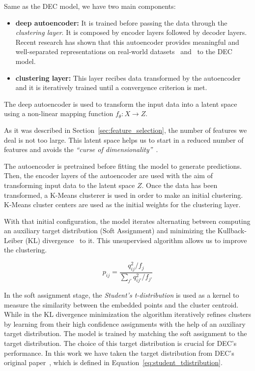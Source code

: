 \documentclass[11pt,a4paper,english,twocolumn]{article}
\begin{document}
Same as the DEC model, we have two main components:

\begin{itemize}
  \item \textbf{deep autoencoder:} It is trained before passing the data through the
        \emph{clustering layer}. It is composed by encoder layers followed by decoder
        layers. Recent research has shown that this autoencoder provides meaningful and
        well-separated representations on real-world datasets~\cite{vincent2010stacked}
        and~\cite{hinton2006reducing} to the DEC model.
  \item \textbf{clustering layer:} This layer recibes data transformed by the autoencoder
        and it is iteratively trained until a convergence criterion is met.
\end{itemize}

The deep autoencoder is used to transform the input data into a latent space using a
non-linear mapping function \(f_{\theta} : X \rightarrow Z\).

As it was described in Section~\ref{sec:feature_selection}, the number of features we
deal is not too large. This latent space helps us to start in a reduced number of
features and avoids the \emph{``curse of dimensionality''}~\cite{bellman1961curse}.

The autoencoder is pretrained before fitting the model to generate predictions. Then,
the encoder layers of the autoencoder are used with the aim of transforming input data to
the latent space \(Z\). Once the data has been transformed, a K-Means clusterer is used in
order to make an initial clustering. K-Means cluster centers are used as the initial
weights for the clustering layer.

With that initial configuration, the model iterates alternating between computing an auxiliary
target distribution (Soft Assignment) and minimizing the Kullback-Leiber (KL)
divergence~\cite{kullback1951information} to it.
This unsupervised algorithm allows us to improve the clustering.

\begin{equation}
  p_{ij} = \frac{q^{2}_{ij} / f_{j}}{\sum_{j'}q^{2}_{ij'}/f_{j'}}
  \label{eq:student_tdistribution}
\end{equation}

In the soft assignment stage,
the \emph{Student's t-distribution} is used as a kernel to measure the similarity
between the embedded points and the cluster centroid.
While in the KL divergence minimization the algorithm iteratively refines clusters by learning
from their high confidence assignments with the help of an auxiliary target distribution.
The model is trained by matching the soft assignment to the target distribution.
The choice of this target distribution is crucial for DEC's performance.
In this work we have taken the target distribution from DEC's original paper~\cite{xie2016unsupervised},
which is defined in Equation~\ref{eq:student_tdistribution}.
\end{document}
